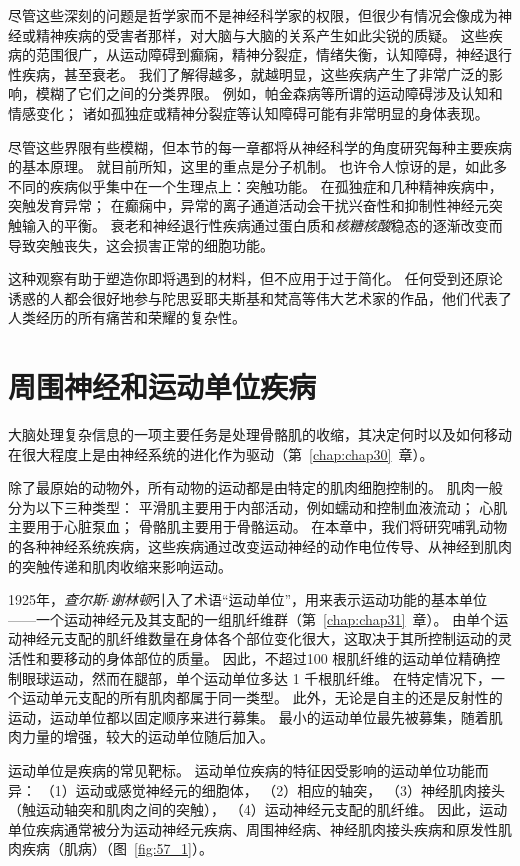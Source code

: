 尽管这些深刻的问题是哲学家而不是神经科学家的权限，但很少有情况会像成为神经或精神疾病的受害者那样，对大脑与大脑的关系产生如此尖锐的质疑。
这些疾病的范围很广，从运动障碍到癫痫，精神分裂症，情绪失衡，认知障碍，神经退行性疾病，甚至衰老。
我们了解得越多，就越明显，这些疾病产生了非常广泛的影响，模糊了它们之间的分类界限。
例如，帕金森病等所谓的运动障碍涉及认知和情感变化；
诸如孤独症或精神分裂症等认知障碍可能有非常明显的身体表现。


尽管这些界限有些模糊，但本节的每一章都将从神经科学的角度研究每种主要疾病的基本原理。
就目前所知，这里的重点是分子机制。
也许令人惊讶的是，如此多不同的疾病似乎集中在一个生理点上：突触功能。
在孤独症和几种精神疾病中，突触发育异常；
在癫痫中，异常的离子通道活动会干扰兴奋性和抑制性神经元突触输入的平衡。
衰老和神经退行性疾病通过蛋白质和\textit{核糖核酸}稳态的逐渐改变而导致突触丧失，这会损害正常的细胞功能。


这种观察有助于塑造你即将遇到的材料，但不应用于过于简化。
任何受到还原论诱惑的人都会很好地参与陀思妥耶夫斯基和梵高等伟大艺术家的作品，他们代表了人类经历的所有痛苦和荣耀的复杂性。




\chapter{周围神经和运动单位疾病} \label{chap:chap57}

大脑处理复杂信息的一项主要任务是处理骨骼肌的收缩，其决定何时以及如何移动在很大程度上是由神经系统的进化作为驱动（第~\ref{chap:chap30}~章）。


除了最原始的动物外，所有动物的运动都是由特定的肌肉细胞控制的。
肌肉一般分为以下三种类型：
平滑肌主要用于内部活动，例如蠕动和控制血液流动；
心肌主要用于心脏泵血；
骨骼肌主要用于骨骼运动。
在本章中，我们将研究哺乳动物的各种神经系统疾病，这些疾病通过改变运动神经的动作电位传导、从神经到肌肉的突触传递和肌肉收缩来影响运动。


1925年，\textit{查尔斯$\cdot$谢林顿}引入了术语“运动单位”，用来表示运动功能的基本单位——一个运动神经元及其支配的一组肌纤维群（第~\ref{chap:chap31}~章）。
由单个运动神经元支配的肌纤维数量在身体各个部位变化很大，这取决于其所控制运动的灵活性和要移动的身体部位的质量。
因此，不超过100 根肌纤维的运动单位精确控制眼球运动，然而在腿部，单个运动单位多达 1 千根肌纤维。
在特定情况下，一个运动单元支配的所有肌肉都属于同一类型。
此外，无论是自主的还是反射性的运动，运动单位都以固定顺序来进行募集。
最小的运动单位最先被募集，随着肌肉力量的增强，较大的运动单位随后加入。


运动单位是疾病的常见靶标。
运动单位疾病的特征因受影响的运动单位功能而异：
（1）运动或感觉神经元的细胞体，
（2）相应的轴突，
（3）神经肌肉接头（触运动轴突和肌肉之间的突触），
（4）运动神经元支配的肌纤维。
因此，运动单位疾病通常被分为运动神经元疾病、周围神经病、神经肌肉接头疾病和原发性肌肉疾病（肌病）（图~\ref{fig:57_1}）。


